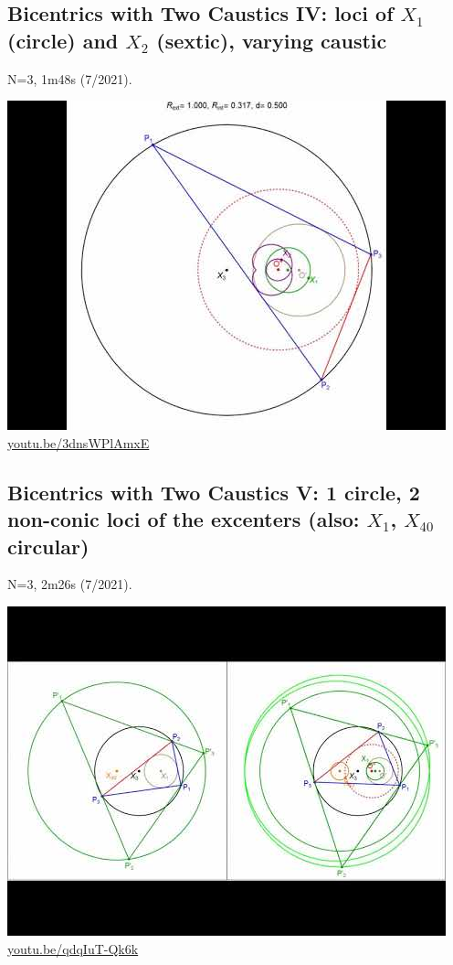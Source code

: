 \documentclass[12pt]{amsart}
\begin{document}
\subsection{Bicentrics with Two Caustics IV: loci of $X_{1}$ (circle) and $X_{2}$ (sextic), varying caustic}
\label{vid:3dnsWPlAmxE}
\noindent N=3, 1m48s (7/2021). 
\begin{center}\includegraphics[width=.5\textwidth]{pics/3dnsWPlAmxE.jpg} \\ 
\href{https://youtu.be/3dnsWPlAmxE}{\url{youtu.be/3dnsWPlAmxE}}\end{center}
% 

\subsection{Bicentrics with Two Caustics V: 1 circle, 2 non-conic loci of the excenters (also: $X_{1}$, $X_{40}$ circular)}
\label{vid:qdqIuT-Qk6k}
\noindent N=3, 2m26s (7/2021). 
\begin{center}\includegraphics[width=.5\textwidth]{pics/qdqIuT-Qk6k.jpg} \\ 
\href{https://youtu.be/qdqIuT-Qk6k}{\url{youtu.be/qdqIuT-Qk6k}}\end{center}
% 
\end{document}
